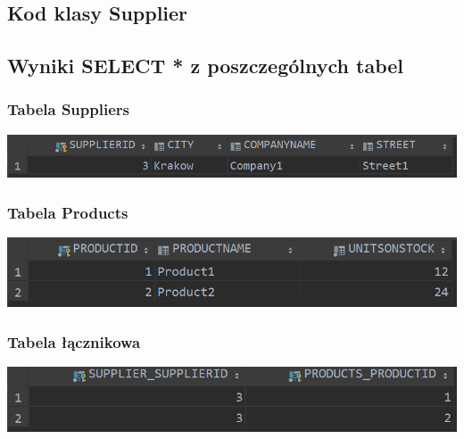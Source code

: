 \documentclass[a4paper, 11pt]{article}
\begin{document}
    \newpage

    \subsection{Kod klasy Supplier}
    

    \newpage

    \subsection{Wyniki SELECT * z poszczególnych tabel}
    \subsubsection{Tabela Suppliers}
    \begin{center}
        \includegraphics{images/point4_additional_table/SelectSuppliers.png}
    \end{center}

    \subsubsection{Tabela Products}
    \begin{center}
        \includegraphics{images/point4_additional_table/SelectProducts.png}
    \end{center}

    \subsubsection{Tabela łącznikowa}
    \begin{center}
        \includegraphics{images/point4_additional_table/SelectJoinTable.png}
    \end{center}
\end{document}
